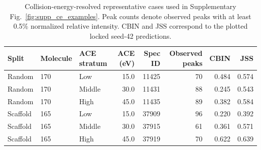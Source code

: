 \begin{table}[!t]
\caption{Collision-energy-resolved representative cases used in Supplementary Fig.~\ref{fig:supp_ce_examples}. Peak counts denote observed peaks with at least 0.5\% normalized relative intensity. CBIN and JSS correspond to the plotted locked seed-42 predictions.}
\label{tab:supp_ce_cases}
\centering
\scriptsize
\setlength{\tabcolsep}{4pt}
\begin{tabular*}{\textwidth}{@{\extracolsep{\fill}}lllrrrrr}
\toprule
Split & Molecule & ACE stratum & ACE (eV) & Spec ID & Observed peaks & CBIN & JSS \\
\midrule
Random & 170 & Low & 15.0 & 11425 & 70 & 0.484 & 0.574 \\
Random & 170 & Middle & 30.0 & 11431 & 88 & 0.245 & 0.543 \\
Random & 170 & High & 45.0 & 11435 & 89 & 0.382 & 0.584 \\
Scaffold & 165 & Low & 15.0 & 37909 & 96 & 0.220 & 0.392 \\
Scaffold & 165 & Middle & 30.0 & 37915 & 61 & 0.361 & 0.571 \\
Scaffold & 165 & High & 45.0 & 37919 & 70 & 0.622 & 0.639 \\
\bottomrule
\end{tabular*}
\end{table}
